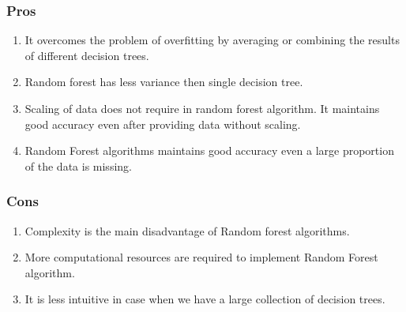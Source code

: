 \documentclass[12pt]{article}
\begin{document}
\subsubsection{Pros}
\begin{enumerate}
    \item It overcomes the problem of overfitting by averaging or combining the results of different decision trees.
    \item Random forest has less variance then single decision tree.
    \item Scaling of data does not require in random forest algorithm. It maintains good accuracy even after providing data without scaling.
    \item Random Forest algorithms maintains good accuracy even a large proportion of the data is missing.
\end{enumerate}
\subsubsection{Cons}
\begin{enumerate}
    \item Complexity is the main disadvantage of Random forest algorithms.
    \item More computational resources are required to implement Random Forest algorithm.
    \item It is less intuitive in case when we have a large collection of decision trees.
\end{enumerate}
\end{document}
